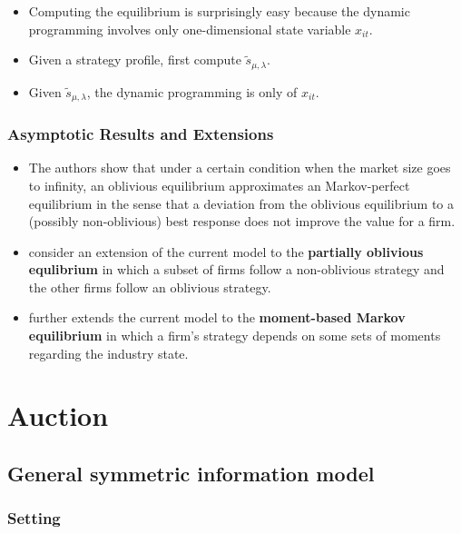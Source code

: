 \documentclass[
]{book}
\providecommand{\tightlist}{%
  \setlength{\itemsep}{0pt}\setlength{\parskip}{0pt}}
\begin{document}
\begin{itemize}
\tightlist
\item
  Computing the equilibrium is surprisingly easy because the dynamic
  programming involves only one-dimensional state variable \(x_{it}\).
\item
  Given a strategy profile, first compute \(\tilde{s}_{\mu, \lambda}\).
\item
  Given \(\tilde{s}_{\mu, \lambda}\), the dynamic programming is only of
  \(x_{it}\).
\end{itemize}

\hypertarget{asymptotic-results-and-extensions}{%
\subsection{Asymptotic Results and Extensions}\label{asymptotic-results-and-extensions}}

\begin{itemize}
\tightlist
\item
  The authors show that under a certain condition when the market size
  goes to infinity, an oblivious equilibrium approximates an
  Markov-perfect equilibrium in the sense that a deviation from the
  oblivious equilibrium to a (possibly non-oblivious) best response
  does not improve the value for a firm.
\item
  \citet{Benkard2015} consider an extension of the current model to the
  \textbf{partially oblivious equlibrium} in which a subset of firms follow
  a non-oblivious strategy and the other firms follow an oblivious
  strategy.
\item
  \citet{Ifrach2017} further extends the current model to the \textbf{moment-based
  Markov equilibrium} in which a firm's strategy depends on some sets
  of moments regarding the industry state.
\end{itemize}

\hypertarget{auction}{%
\chapter{Auction}\label{auction}}

\hypertarget{general-symmetric-information-model}{%
\section{General symmetric information model}\label{general-symmetric-information-model}}

\hypertarget{setting-5}{%
\subsection{Setting}\label{setting-5}}
\end{document}
